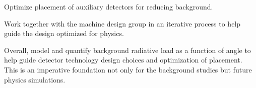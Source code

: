 \begin{itemize}[label=\textbullet]
		\litem{} Optimize placement of auxiliary detectors for reducing background.
					
		\litem{} Work together with the machine design group in an iterative process to help guide the design optimized for physics.
		
		\litem{} Overall, model and quantify background radiative load as a function of angle to help guide detector technology design choices and optimization of placement.  This is an imperative foundation not only for the background studies but future physics simulations.
	
	\end{itemize}